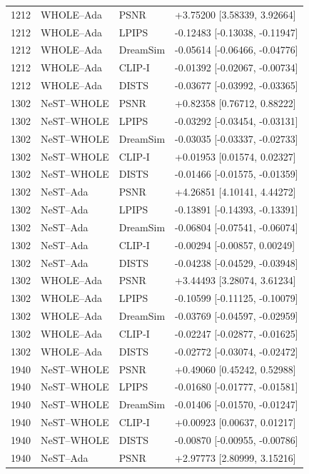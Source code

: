 \documentclass[10pt,letterpaper]{article}
\begin{document}
\begin{longtable}{@{}rlll@{}}
1212 & WHOLE--Ada & PSNR & +3.75200 [3.58339, 3.92664]\\
1212 & WHOLE--Ada & LPIPS & -0.12483 [-0.13038, -0.11947]\\
1212 & WHOLE--Ada & DreamSim & -0.05614 [-0.06466, -0.04776]\\
1212 & WHOLE--Ada & CLIP-I & -0.01392 [-0.02067, -0.00734]\\
1212 & WHOLE--Ada & DISTS & -0.03677 [-0.03992, -0.03365]\\
1302 & NeST--WHOLE & PSNR & +0.82358 [0.76712, 0.88222]\\
1302 & NeST--WHOLE & LPIPS & -0.03292 [-0.03454, -0.03131]\\
1302 & NeST--WHOLE & DreamSim & -0.03035 [-0.03337, -0.02733]\\
1302 & NeST--WHOLE & CLIP-I & +0.01953 [0.01574, 0.02327]\\
1302 & NeST--WHOLE & DISTS & -0.01466 [-0.01575, -0.01359]\\
1302 & NeST--Ada & PSNR & +4.26851 [4.10141, 4.44272]\\
1302 & NeST--Ada & LPIPS & -0.13891 [-0.14393, -0.13391]\\
1302 & NeST--Ada & DreamSim & -0.06804 [-0.07541, -0.06074]\\
1302 & NeST--Ada & CLIP-I & -0.00294 [-0.00857, 0.00249]\\
1302 & NeST--Ada & DISTS & -0.04238 [-0.04529, -0.03948]\\
1302 & WHOLE--Ada & PSNR & +3.44493 [3.28074, 3.61234]\\
1302 & WHOLE--Ada & LPIPS & -0.10599 [-0.11125, -0.10079]\\
1302 & WHOLE--Ada & DreamSim & -0.03769 [-0.04597, -0.02959]\\
1302 & WHOLE--Ada & CLIP-I & -0.02247 [-0.02877, -0.01625]\\
1302 & WHOLE--Ada & DISTS & -0.02772 [-0.03074, -0.02472]\\
1940 & NeST--WHOLE & PSNR & +0.49060 [0.45242, 0.52988]\\
1940 & NeST--WHOLE & LPIPS & -0.01680 [-0.01777, -0.01581]\\
1940 & NeST--WHOLE & DreamSim & -0.01406 [-0.01570, -0.01247]\\
1940 & NeST--WHOLE & CLIP-I & +0.00923 [0.00637, 0.01217]\\
1940 & NeST--WHOLE & DISTS & -0.00870 [-0.00955, -0.00786]\\
1940 & NeST--Ada & PSNR & +2.97773 [2.80999, 3.15216]\\

\end{longtable}
\end{document}
